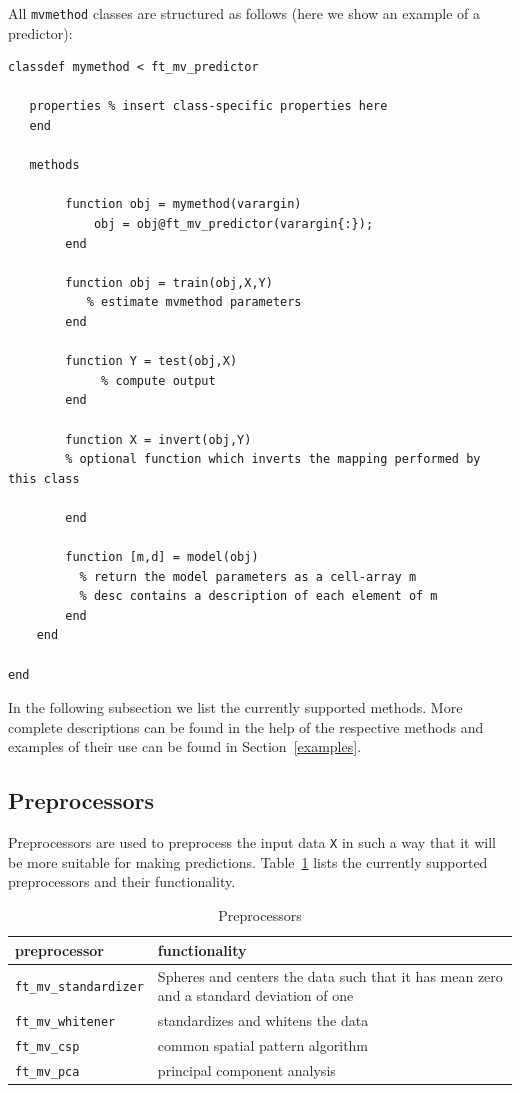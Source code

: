 \documentclass{article}
\renewcommand{\t}[1]{{\tt #1}}
\begin{document}
All \t{mvmethod} classes are structured as follows (here we show an example of a predictor):
\begin{verbatim}
classdef mymethod < ft_mv_predictor
 
   properties % insert class-specific properties here
   end
 
   methods
 
        function obj = mymethod(varargin)       
         	obj = obj@ft_mv_predictor(varargin{:});
        end        
 
        function obj = train(obj,X,Y)
           % estimate mvmethod parameters
        end
 
        function Y = test(obj,X)
        	 % compute output     
        end
 	
        function X = invert(obj,Y)
        % optional function which inverts the mapping performed by this class
        
        end
 
        function [m,d] = model(obj)
          % return the model parameters as a cell-array m
          % desc contains a description of each element of m 
        end
    end
 
end
\end{verbatim}

In the following subsection we list the currently supported methods. More complete descriptions can be found in the help of the respective methods and examples of their use can be found in Section~\ref{examples}.

\subsection{Preprocessors}

Preprocessors are used to preprocess the input data \t{X} in such a way that it will be more suitable for making predictions. Table~\ref{preprocessors} lists the currently supported preprocessors and their functionality.

\begin{table}[ht]
\centering
\caption{Preprocessors}
\begin{tabular}{p{}|p{}}
\bf{preprocessor} & \bf{functionality}\\
\hline
\t{ft\_mv\_standardizer} & Spheres and centers the data such that it has mean zero and a standard deviation of one\\
\t{ft\_mv\_whitener} & standardizes and whitens the data\\
\t{ft\_mv\_csp} & common spatial pattern algorithm\\
\t{ft\_mv\_pca} & principal component analysis
\end{tabular}
\label{preprocessors}
\end{table}
\end{document}
